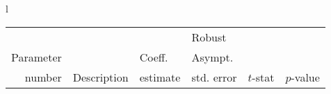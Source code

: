  \begin{tabular}{l}
\begin{tabular}{rlr@{.}lr@{.}lr@{.}lr@{.}l}
         &                       &   \multicolumn{2}{l}{}    & \multicolumn{2}{l}{Robust}  &     \multicolumn{4}{l}{}   \\
Parameter &                       &   \multicolumn{2}{l}{Coeff.}      & \multicolumn{2}{l}{Asympt.}  &     \multicolumn{4}{l}{}   \\
number &  Description                     &   \multicolumn{2}{l}{estimate}      & \multicolumn{2}{l}{std. error}  &   \multicolumn{2}{l}{$t$-stat}  &   \multicolumn{2}{l}{$p$-value}   \\

\hline


\end{tabular}
\end{tabular}

